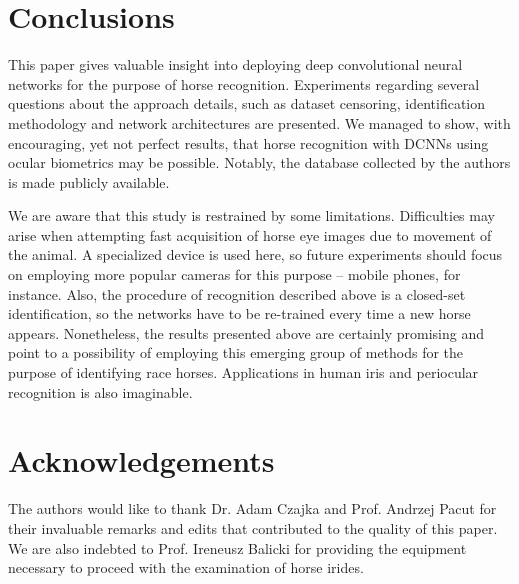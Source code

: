 \documentclass[10pt,twocolumn,letterpaper]{article}
\begin{document}
\section{Conclusions}
\label{sec:Conclusions}
This paper gives valuable insight into deploying deep convolutional neural networks for the purpose of horse recognition. Experiments regarding several questions about the approach details, such as dataset censoring, identification methodology and network architectures are presented. We managed to show, with encouraging, yet not perfect results, that horse recognition with DCNNs using ocular biometrics may be possible. Notably, the database collected by the authors is made publicly available.

We are aware that this study is restrained by some limitations. Difficulties may arise when attempting fast acquisition of horse eye images due to movement of the animal. A specialized device is used here, so future experiments should focus on employing more popular cameras for this purpose -- mobile phones, for instance. Also, the procedure of recognition described above is a closed-set identification, so the networks have to be re-trained every time a new horse appears. Nonetheless, the results presented above are certainly promising and point to a possibility of employing this emerging group of methods for the purpose of identifying race horses. Applications in human iris and periocular recognition is also imaginable.

\section*{Acknowledgements}
The authors would like to thank Dr. Adam Czajka and Prof. Andrzej Pacut for their invaluable remarks and edits that contributed to the quality of this paper. We are also indebted to Prof. Ireneusz Balicki for providing the equipment necessary to proceed with the examination of horse irides.   

{\small


}
\end{document}
